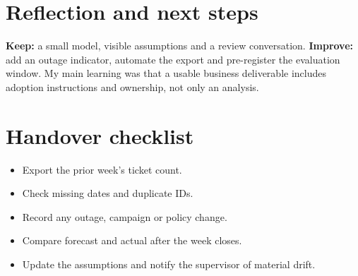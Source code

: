 \documentclass[11pt,a4paper]{report}
\begin{document}
\chapter{Reflection and next steps}\textbf{Keep:} a small model, visible assumptions and a review conversation. \textbf{Improve:} add an outage indicator, automate the export and pre-register the evaluation window. My main learning was that a usable business deliverable includes adoption instructions and ownership, not only an analysis.
\appendix\chapter{Handover checklist}\begin{itemize}[leftmargin=*]\item Export the prior week’s ticket count.\item Check missing dates and duplicate IDs.\item Record any outage, campaign or policy change.\item Compare forecast and actual after the week closes.\item Update the assumptions and notify the supervisor of material drift.\end{itemize}
\end{document}
